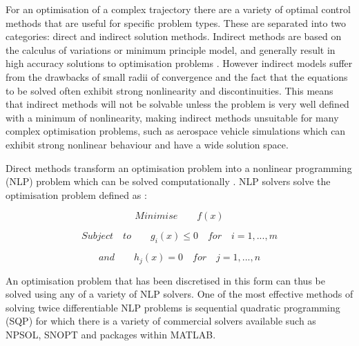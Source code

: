 For an optimisation of a complex trajectory there are a variety of optimal control methods that are useful for specific problem types. These are separated into two categories: direct and indirect solution methods. Indirect methods are based on the calculus of variations or minimum principle model, and generally result in high accuracy solutions to optimisation problems \cite{Bulirsch1993}. However indirect models suffer from the drawbacks of small radii of convergence and the fact that the equations to be solved often exhibit strong nonlinearity and discontinuities. This means that indirect methods will not be solvable unless the problem is very well defined with a minimum of nonlinearity, making indirect methods unsuitable for many complex optimisation problems, such as aerospace vehicle simulations which can exhibit strong nonlinear behaviour and have a wide solution space. 

Direct methods transform an optimisation problem into a nonlinear programming (NLP) problem which can be solved computationally \cite{Stryk1992}. NLP solvers solve the optimisation problem defined as \cite{Bazaraa2013}:

\begin{equation}
Minimise \qquad f(x)
\end{equation}

\begin{equation}
Subject \quad to \qquad g_i(x)\leq0 \quad for \quad i=1,...,m
\end{equation}

\begin{equation}
and \qquad h_j(x) = 0 \quad for \quad j=1,...,n
\end{equation}

An optimisation problem that has been discretised in this form can thus be solved using any of a variety of NLP solvers. One of the most effective methods of solving twice differentiable NLP problems is sequential quadratic programming (SQP) \cite{Boggs2000} for which there is a variety of commercial solvers available such as NPSOL, SNOPT and packages within MATLAB. 

